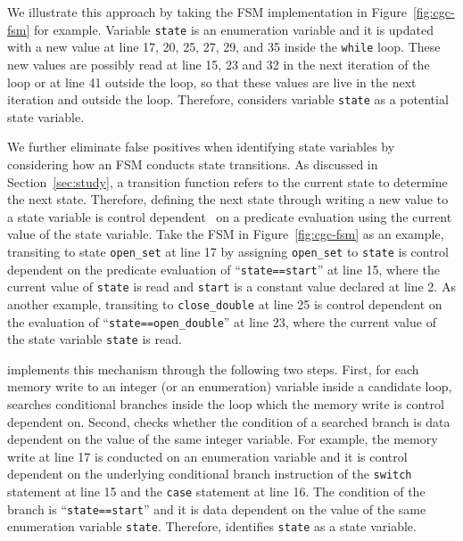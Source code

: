 We illustrate this approach by taking the FSM implementation
in Figure~\ref{fig:cgc-fsm} for example. 
Variable \texttt{state} is an enumeration variable and it is updated 
with a new value at 
line 17, 20, 25, 27, 29, and 35 inside the \texttt{while} loop. 
These new values are possibly read at line 15, 23 and 32 
in the next iteration of the loop or at line 41 outside the loop, 
so that these values are live in the next iteration and outside the loop. 
Therefore, \Tool{} considers variable \texttt{state} as a potential 
state variable.  



We further eliminate false positives when identifying state variables 
by considering how an FSM conducts state transitions. 
As discussed in Section~\ref{sec:study}, 
a transition function refers to the current state to determine the next state. 
Therefore, defining the next state through writing a new value to a state variable 
is control dependent~\cite{cdg} on a predicate evaluation 
using the current value of the state variable.  
Take the FSM in Figure~\ref{fig:cgc-fsm} as an example, 
transiting to state \texttt{open\_set} at line 17 by assigning 
\texttt{open\_set} to \texttt{state} 
is control dependent on the predicate evaluation 
of ``\texttt{state==start}'' at line 15,
where the current value of \texttt{state} is read 
and \texttt{start} is a constant value declared at line 2. 
As another example, transiting to \texttt{close\_double} at 
line 25 is control dependent on the 
evaluation of ``\texttt{state==open\_double}'' at line 23, 
where the current value of the state variable \texttt{state} is read. 



\Tool{} implements this mechanism through the following two steps. 
First, for each memory write to an integer (or an enumeration) 
variable inside a candidate loop, 
\Tool{} searches conditional branches inside the loop 
which the memory write is control dependent on. 
Second, \Tool{} checks whether the condition of a searched branch 
is data dependent on the value of the same integer variable. 
For example, the memory write at line 17 is conducted on an enumeration variable
and it is control dependent on the underlying conditional branch 
instruction of 
the \texttt{switch} statement at line 15 and the \texttt{case} statement at line 16.  
The condition of the branch is ``\texttt{state==start}'' and it is 
data dependent on the value of the same enumeration variable \texttt{state}. 
Therefore, \Tool{} identifies \texttt{state} as a state variable. 




